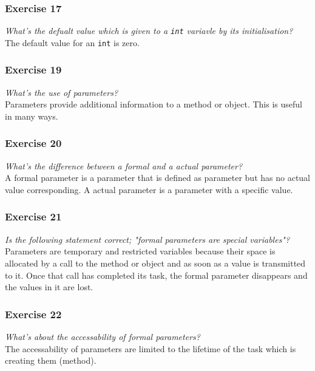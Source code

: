 \subsubsection*{Exercise 17}
\textit{What's the defualt value which is given to a \lstinline{int} variavle
	by its initialisation?}\\

The default value for an \lstinline{int} is zero.

\subsubsection*{Exercise 19}
\textit{What's the use of parameters?}\\

Parameters provide additional information to a method or object. This is
useful in many ways.

\subsubsection*{Exercise 20}
\textit{What's the difference between a formal and a actual parameter?}\\

A formal parameter is a parameter that is defined as parameter but has no 
actual value corresponding. A actual parameter is a parameter with a 
specific value.

\subsubsection*{Exercise 21}
\textit{Is the following statement correct; "formal parameters are special
	variables"?}\\

Parameters are temporary and restricted variables because their space is
allocated by a call to the method or object and as soon as a value is 
transmitted to it. Once that call has completed its task, the formal
parameter disappears and the values in it are lost.

\subsubsection*{Exercise 22}
\textit{What's about the accessability of formal parameters?}\\

The accessability of parameters are limited to the lifetime of the task
which is creating them (method).

